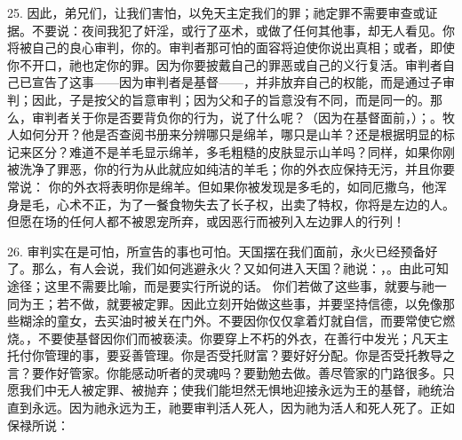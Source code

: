 25. 因此，弟兄们，让我们害怕，以免天主定我们的罪；祂定罪不需要审查或证据。不要说：夜间我犯了奸淫，或行了巫术，或做了任何其他事，却无人看见。你将被自己的良心审判，你的。审判者那可怕的面容将迫使你说出真相；或者，即使你不开口，祂也定你的罪。因为你要披戴自己的罪恶或自己的义行复活。审判者自己已宣告了这事——因为审判者是基督——，并非放弃自己的权能，而是通过子审判；因此，子是按父的旨意审判；因为父和子的旨意没有不同，而是同一的。那么，审判者关于你是否要背负你的行为，说了什么呢？（因为在基督面前，）；。牧人如何分开？他是否查阅书册来分辨哪只是绵羊，哪只是山羊？还是根据明显的标记来区分？难道不是羊毛显示绵羊，多毛粗糙的皮肤显示山羊吗？同样，如果你刚被洗净了罪恶，你的行为从此就应如纯洁的羊毛；你的外衣应保持无污，并且你要常说： 你的外衣将表明你是绵羊。但如果你被发现是多毛的，如同厄撒乌，他浑身是毛，心术不正，为了一餐食物失去了长子权，出卖了特权，你将是左边的人。但愿在场的任何人都不被恩宠所弃，或因恶行而被列入左边罪人的行列！\par

26. 审判实在是可怕，所宣告的事也可怕。天国摆在我们面前，永火已经预备好了。那么，有人会说，我们如何逃避永火？又如何进入天国？祂说：，。由此可知途径；这里不需要比喻，而是要实行所说的话。 你们若做了这些事，就要与祂一同为王；若不做，就要被定罪。因此立刻开始做这些事，并要坚持信德，以免像那些糊涂的童女，去买油时被关在门外。不要因你仅仅拿着灯就自信，而要常使它燃烧。，不要使基督因你们而被亵渎。你要穿上不朽的外衣，在善行中发光；凡天主托付你管理的事，要妥善管理。你是否受托财富？要好好分配。你是否受托教导之言？要作好管家。你能感动听者的灵魂吗？要勤勉去做。善尽管家的门路很多。只愿我们中无人被定罪、被抛弃；使我们能坦然无惧地迎接永远为王的基督，祂统治直到永远。因为祂永远为王，祂要审判活人死人，因为祂为活人和死人死了。正如保禄所说：\par


